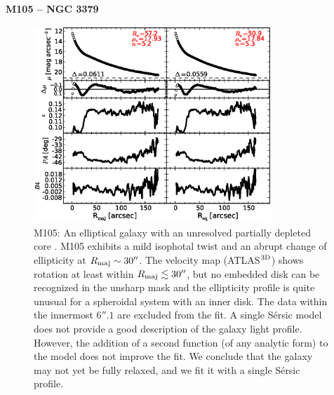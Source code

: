 \documentclass[preprint2]{emulateapj}
\newcommand{\fitfigurewidth}{0.8\textwidth}
\begin{document}
  \clearpage\newpage\noindent
  {\bf M105 -- NGC 3379 \\}

  \begin{figure}[h]
  \begin{center}
  \includegraphics[width=\fitfigurewidth]{images/m105_1Dfit.eps}
  \caption{M105: 
  An elliptical galaxy with an unresolved partially depleted core \citep{rusli2013}. %
  M105 exhibits a mild isophotal twist and an abrupt change of ellipticity at $R_{\rm maj} \sim 30''$.
  The velocity map (ATLAS$^{\rm 3D}$) shows rotation at least within $R_{\rm maj} \lesssim 30''$, 
  but no embedded disk can be recognized in the unsharp mask 
  and the ellipticity profile is quite unusual for a spheroidal system with an inner disk.
  The data within the innermost $6''.1$ are excluded from the fit.
  A single S\'ersic model does not provide a good description of the galaxy light profile.
  However, the addition of a second function (of any analytic form) to the model does not improve the fit.
  We conclude that the galaxy may not yet be fully relaxed, and we fit it with a single S\'ersic profile. 
  }
  \end{center}
  \end{figure}
\end{document}
